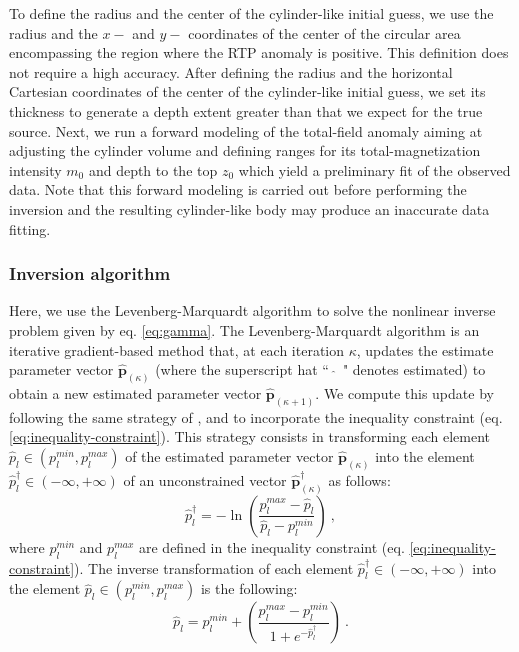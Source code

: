 To define the radius and the center of the cylinder-like initial guess, we 
use the radius and the $x-$ and $y-$ coordinates of the center of the
circular area encompassing the region where the RTP anomaly is positive.
This definition does not require a high accuracy. 
After defining the radius and the horizontal Cartesian coordinates of the center 
of the cylinder-like initial guess, we set its thickness to generate 
a depth extent greater than that we expect for the true source. 
Next, we run a forward modeling of the total-field anomaly aiming at adjusting the
cylinder volume and defining ranges for its total-magnetization intensity $m_{0}$ 
and depth to the top $z_{0}$ which yield a preliminary fit of the observed data.
Note that this forward modeling is carried out before performing the inversion 
and the resulting cylinder-like body may produce an inaccurate data fitting.


\subsubsection{Inversion algorithm}

Here, we use the Levenberg-Marquardt algorithm \cite[e.g., ][ p. 240]{aster-etal2019} to solve the nonlinear inverse problem given by eq. \ref{eq:gamma}.
The Levenberg-Marquardt algorithm is an iterative gradient-based method that, at each iteration $\kappa$, updates the estimate parameter vector $\hat{\mathbf{p}}_{(\kappa)}$ (where the superscript hat ``~$\hat{}$~" denotes estimated) to obtain a new estimated parameter vector $\hat{\mathbf{p}}_{(\kappa + 1)}$.
We compute this update by following the same strategy of \cite{barbosa-1999b}, \cite{oliveirajr-etal2011} and \cite{oliveirajr-barbosa2013} to incorporate the inequality constraint (eq. \ref{eq:inequality-constraint}). 
This strategy consists in transforming each element $\hat{p}_{l} \in (p_{l}^{min}, p_{l}^{max})$ of the estimated parameter vector $\hat{\mathbf{p}}_{(\kappa)}$ 
into the element $\hat{p}^{\dagger}_{l} \in (- \infty, + \infty)$ of an 
unconstrained vector $\hat{\mathbf{p}}^{\dagger}_{(\kappa)}$ as follows:
\begin{equation}\label{eq:inequality-function}
\hat{p}^{\dagger}_{l} = -\ln\left(\frac{p_{l}^{max} - \hat{p}_{l}}{\hat{p}_{l} - p_{l}^{min}}\right) \: ,
\end{equation}
where $p_{l}^{min}$ and $p_{l}^{max}$ are defined in the inequality constraint 
(eq. \ref{eq:inequality-constraint}).
The inverse transformation of each element $\hat{p}^{\dagger}_{l} \in (- \infty, + \infty)$ into the element $\hat{p}_{l} \in (p_{l}^{min}, p_{l}^{max})$ is the following:
\begin{equation}\label{eq:inv-inequality-function}
\hat{p}_{l} = p_{l}^{min} + \left(\frac{p_{l}^{max} - p_{l}^{min}}{ 1 + e^{-\hat{p}^{\dagger}_{l}} }\right) \: .
\end{equation}

